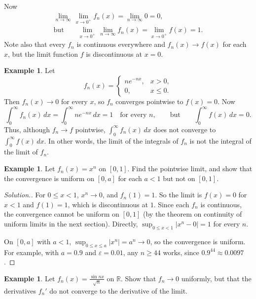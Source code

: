 \documentclass[11pt,a4paper]{article}
\numberwithin{equation}{section}
\theoremstyle{definition}
\newtheorem{exa}[thm]{Example}
\newenvironment{solution}
  {\renewcommand{\qedsymbol}{}\begin{proof}[\textit{Solution}.]}
  {\end{proof}}
\begin{document}
Now
\begin{gather*}
\lim_{n\rightarrow \infty}\, \lim_{x\rightarrow 0^+} f_n(x) = \lim_{n \rightarrow \infty} 0 = 0,\\
\text{but}\qquad \lim_{x\rightarrow 0^+}\,\lim_{n\rightarrow \infty} f_n(x) = \lim_{x \rightarrow 0^+} f(x) = 1 .
\end{gather*}
Note also that every $f_n$ is continuous everywhere and $f_n(x) \longrightarrow f(x)$ for each $x$, but the limit function $f$ is discontinuous at $x= 0$.


\begin{exa}
Let
\[
f_n(x) = \begin{cases}
n e^{-nx}, & x>0,\\
0, & x\leq 0.
\end{cases}
\]
Then $f_n(x) \longrightarrow 0$ for every $x$, so $f_n$ converges pointwise to $f(x) = 0$. Now
$$\int^{\infty}_0f_n(x)\,dx = \int^{\infty}_0 n e^{-nx}\,dx = 1 \quad\text{for every } n, \qquad\text{but}\qquad \int^{\infty}_0 f(x)\, dx = 0 .$$
Thus, although $f_n \longrightarrow f$ pointwise, $\int^{\infty}_0f_n(x)\, dx$ does not converge to $\int^{\infty}_0f(x)\, dx$. In other words, the limit of the integrals of $f_n$ is not the integral of the limit of $f_n$.
\end{exa}

\begin{exa}
Let $f_n(x) = x^n$ on $[0,1]$. Find the pointwise limit, and show that the convergence is uniform on $[0,a]$ for each $a<1$ but not on $[0,1]$.
\end{exa}

\begin{solution}
For $0\leq x<1$, $x^n\longrightarrow0$, and $f_n(1) = 1$. So the limit is $f(x) = 0$ for $x<1$ and $f(1) = 1$, which is discontinuous at $1$. Since each $f_n$ is continuous, the convergence cannot be uniform on $[0,1]$ (by the theorem on continuity of uniform limits in the next section). Directly, $\sup_{0\leq x<1}|x^n - 0| = 1$ for every $n$.

On $[0,a]$ with $a<1$, $\sup_{0\leq x\leq a}|x^n| = a^n\longrightarrow0$, so the convergence is uniform. For example, with $a = 0.9$ and $\varepsilon = 0.01$, any $n\geq 44$ works, since $0.9^{44}\approx 0.0097$.
\end{solution}

\begin{exa}
Let $f_n(x) = \frac{\sin nx}{\sqrt{n}}$ on $\mathbb{R}$. Show that $f_n\longrightarrow0$ uniformly, but that the derivatives $f_n'$ do not converge to the derivative of the limit.
\end{exa}
\end{document}
